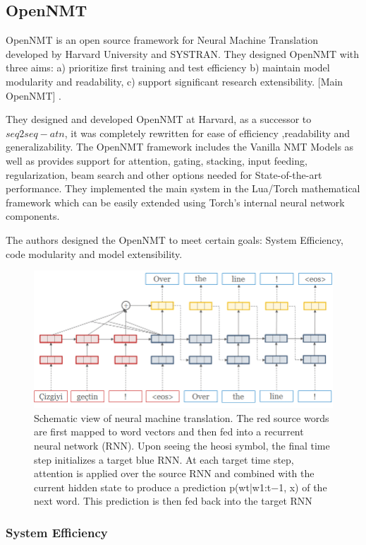 \subsection{OpenNMT}
OpenNMT is an open source framework for Neural Machine Translation developed by Harvard University and SYSTRAN. They designed OpenNMT with three aims: a) prioritize first training and test efficiency b) maintain model modularity and readability, c) support significant research extensibility. [Main OpenNMT] . 

They designed and developed  OpenNMT at Harvard, as a successor to $seq2seq-atn$, it was completely rewritten for ease of efficiency ,readability and generalizability. The OpenNMT framework includes the Vanilla NMT Models as well as provides support for attention, gating, stacking, input feeding, regularization, beam search and other options needed for State-of-the-art performance. They implemented the main system in the Lua/Torch mathematical framework which can be easily extended using Torch's internal neural network components. 

The authors designed the OpenNMT to meet certain goals: System Efficiency, code modularity and model extensibility. 

\begin{figure}
\includegraphics[width=\textwidth]{figures/openmt.png}
\caption{ Schematic view of neural machine translation. The red source words are first mapped to
word vectors and then fed into a recurrent neural network (RNN). Upon seeing the heosi symbol, the final
time step initializes a target blue RNN. At each target time step, attention is applied over the source RNN
and combined with the current hidden state to produce a prediction p(wt|w1:t−1, x) of the next word. This
prediction is then fed back into the target RNN} \label{fig1}
\end{figure}


\subsubsection{System Efficiency}

